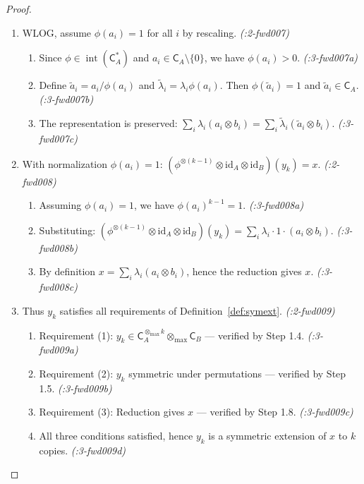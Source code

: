\documentclass[11pt,a4paper]{article}
\theoremstyle{definition}
\theoremstyle{plain}
\newcommand{\proofstep}[2]{\item[$\langle #1 \rangle$#2.]}
\DeclareMathOperator{\inte}{int}
\newcommand{\tmax}{{\otimes_{\max}}}
\newcommand{\C}{\mathsf{C}}
\begin{document}
\begin{proof}
\begin{enumerate}[leftmargin=2em]
\proofstep{1}{7} WLOG, assume $\phi(a_i) = 1$ for all $i$ by rescaling. \textit{(:2-fwd007)}
\begin{enumerate}[leftmargin=1.5em, label=$\langle 2.\alph* \rangle$]
\item Since $\phi \in \inte(\C_A^*)$ and $a_i \in \C_A \setminus \{0\}$, we have $\phi(a_i) > 0$. \textit{(:3-fwd007a)}
\item Define $\tilde{a}_i = a_i / \phi(a_i)$ and $\tilde{\lambda}_i = \lambda_i \phi(a_i)$. Then $\phi(\tilde{a}_i) = 1$ and $\tilde{a}_i \in \C_A$. \textit{(:3-fwd007b)}
\item The representation is preserved: $\sum_i \lambda_i (a_i \otimes b_i) = \sum_i \tilde{\lambda}_i (\tilde{a}_i \otimes b_i)$. \textit{(:3-fwd007c)}
\end{enumerate}

\proofstep{1}{8} With normalization $\phi(a_i) = 1$: $(\phi^{\otimes(k-1)} \otimes \mathrm{id}_A \otimes \mathrm{id}_B)(y_k) = x$. \textit{(:2-fwd008)}
\begin{enumerate}[leftmargin=1.5em, label=$\langle 2.\alph* \rangle$]
\item Assuming $\phi(a_i) = 1$, we have $\phi(a_i)^{k-1} = 1$. \textit{(:3-fwd008a)}
\item Substituting: $(\phi^{\otimes(k-1)} \otimes \mathrm{id}_A \otimes \mathrm{id}_B)(y_k) = \sum_i \lambda_i \cdot 1 \cdot (a_i \otimes b_i)$. \textit{(:3-fwd008b)}
\item By definition $x = \sum_i \lambda_i (a_i \otimes b_i)$, hence the reduction gives $x$. \textit{(:3-fwd008c)}
\end{enumerate}

\proofstep{1}{9} Thus $y_k$ satisfies all requirements of Definition~\ref{def:symext}. \textit{(:2-fwd009)}
\begin{enumerate}[leftmargin=1.5em, label=$\langle 2.\alph* \rangle$]
\item Requirement (1): $y_k \in \C_A^{\tmax k} \tmax \C_B$ --- verified by Step 1.4. \textit{(:3-fwd009a)}
\item Requirement (2): $y_k$ symmetric under permutations --- verified by Step 1.5. \textit{(:3-fwd009b)}
\item Requirement (3): Reduction gives $x$ --- verified by Step 1.8. \textit{(:3-fwd009c)}
\item All three conditions satisfied, hence $y_k$ is a symmetric extension of $x$ to $k$ copies. \textit{(:3-fwd009d)}
\end{enumerate}


\end{enumerate}
\end{proof}
\end{document}
